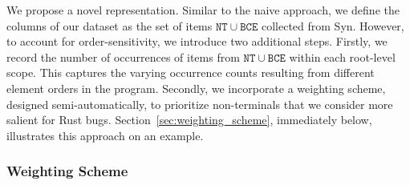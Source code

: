 We propose a novel representation. Similar to the naive approach, we define the columns of our dataset as the set of items $\mathtt{NT} \cup \mathtt{BCE}$ collected from Syn. However, to account for order-sensitivity, we introduce two additional steps. Firstly, we record the number of occurrences of items from $\mathtt{NT} \cup \mathtt{BCE}$ within each root-level scope. This captures the varying occurrence counts resulting from different element orders in the program. Secondly, we incorporate a weighting scheme, designed semi-automatically, to prioritize non-terminals that we consider more salient for Rust bugs. Section~\ref{sec:weighting_scheme}, immediately below,
illustrates this approach on an example.

\subsubsection{\label{sec:weighting_scheme}Weighting Scheme}

